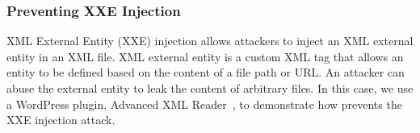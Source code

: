 













\subsubsection{Preventing XXE Injection}
XML External Entity (XXE) injection allows attackers to inject an XML external entity in an XML file. XML external entity is a custom XML tag that allows an entity to be defined based on the content of a file path or URL.
An attacker can abuse the external entity to leak the content of arbitrary files.
In this case, we use a WordPress plugin, Advanced XML Reader~\cite{AdvancedXMLReader}, to demonstrate how \sysname prevents the XXE injection attack.


